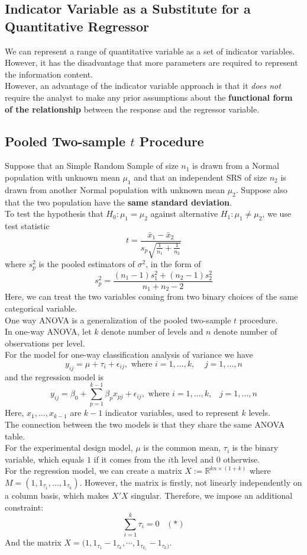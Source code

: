 \documentclass[11pt]{article}
\theoremstyle{definition}
\begin{document}
\subsection{Indicator Variable as a Substitute for a Quantitative Regressor}
We can represent a range of quantitative variable as a set of indicator variables. However, it has the disadvantage that more parameters are required to represent the information content.\\
However, an advantage of the indicator variable approach is that it \textit{does not} require the analyst to make any prior assumptions about the \textbf{functional form of the relationship} between the response and the regressor variable.
\subsection{Pooled Two-sample {$t$} Procedure}
Suppose that an Simple Random Sample of size $n_1$ is drawn from a Normal population with unknown mean $\mu_1$ and that an independent SRS of size $n_2$ is drawn from another Normal population with unknown mean $\mu_2$. Suppose also that the two population have the \textbf{same standard deviation}.\\
To test the hypothesis that $H_0:\mu_1=\mu_2$ against alternative $H_1:\mu_1\neq \mu_2$, we use test statistic
\[
t=\frac{\bar{x}_1-\bar{x}_2}{s_p\sqrt{\frac{1}{n_1}+\frac{1}{n_2}}}
\]
where $s_p^2$ is the pooled estimators of $\sigma^2$, in the form of
\[
s_p^2=\frac{(n_1-1)s_1^2+(n_2-1)s_2^2}{n_1+n_2-2}
\]
Here, we can treat the two variables coming from two binary choices of the same categorical variable.\\
One way ANOVA is a generalization of the pooled two-sample $t$ procedure. \\
In one-way ANOVA, let $k$ denote number of levels and $n$ denote number of observations per level.\\
For the model for one-way classification analysis of variance we have
\[
y_{ij}=\mu+\tau_i+\epsilon_{ij}, \text{ where }i=1,\ldots, k,\;\;\;\;j=1,\ldots, n
\]
and the regression model is
\[
y_{ij}=\beta_0+\sum_{p=1}^{k-1}\beta_px_{pj}+\epsilon_{ij}, \text{ where }i=1,\ldots, k,\;\;\;j=1,\ldots, n
\]
Here, $x_1,\ldots, x_{k-1}$ are $k-1$ indicator variables, used to represent $k$ levels.\\
The connection between the two models is that they share the same ANOVA table.\\
For the experimental design model, $\mu$ is the common mean, $\tau_i$ is the binary variable, which equals $1$ if it comes from the $i$th level and $0$ otherwise.\\
For the regression model, we can create a matrix $X:=\mathbb{R}^{kn\times (1+k)}$ where $M=(1, 1_{\tau_1},\ldots, 1_{\tau_k})$. However, the matrix is firstly, not linearly independently on a column basis, which makes $X'X$ singular. Therefore, we impose an additional constraint:
\[
\sum_{i=1}^k\tau_i = 0\;\;\;(\ast)
\]
And the matrix $X=(1, 1_{\tau_1}-1_{\tau_k}, \cdots, 1_{\tau_{k_1}}-1_{\tau_k)}$.\;\
\end{document}
